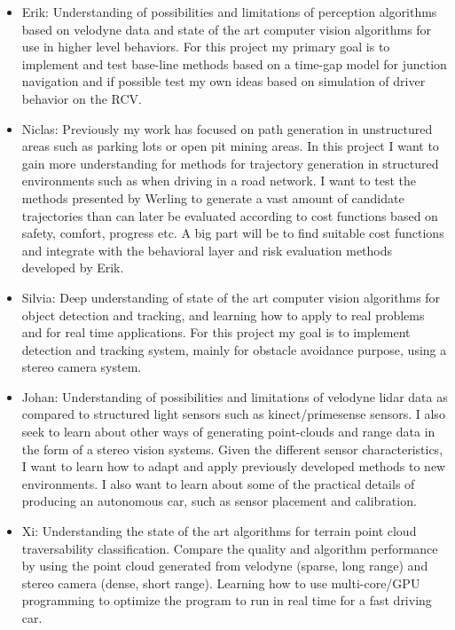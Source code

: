 \documentclass[11pt,a4paper]{article}
\begin{document}
\begin{itemize}
\item 
Erik: Understanding of possibilities and limitations of perception
algorithms based on velodyne data and state of the art computer
vision algorithms for use in higher level behaviors. For this
project my primary goal is to implement and test base-line methods
based on a time-gap model for junction navigation and if possible
test my own ideas based on simulation of driver behavior on the RCV.

\item 
Niclas: Previously my work has focused on path generation in
unstructured areas such as parking lots or open pit mining areas. In
this project I want to gain more understanding for methods for
trajectory generation in structured environments such as when
driving in a road network. I want to test the methods presented by
Werling to generate a vast amount of candidate trajectories than can
later be evaluated according to cost functions based on safety,
comfort, progress etc. A big part will be to find suitable cost
functions and integrate with the behavioral layer and risk
evaluation methods developed by Erik.

\item 
Silvia: Deep understanding of state of the art computer vision algorithms for
object detection and tracking, and learning how to apply to real problems and
for real time applications. For this project my goal is to implement detection
and tracking system, mainly for obstacle avoidance purpose, using a stereo camera system.

\item 
Johan: Understanding of possibilities and limitations of velodyne
lidar data as compared to structured light sensors such as
kinect/primesense sensors. I also seek to learn about other ways of
generating point-clouds and range data in the form of a stereo vision
systems. Given the different sensor characteristics, I want to learn
how to adapt and apply previously developed methods to new
environments. I also want to learn about some of the practical
details of producing an autonomous car, such as sensor placement and
calibration.

\item 
Xi: Understanding the state of the art algorithms for terrain point
cloud traversability classification. Compare the quality and
algorithm performance by using the point cloud generated from
velodyne (sparse, long range) and stereo camera (dense, short
range). Learning how to use multi-core/GPU programming to optimize
the program to run in real time for a fast driving car.


\end{itemize}
\end{document}
